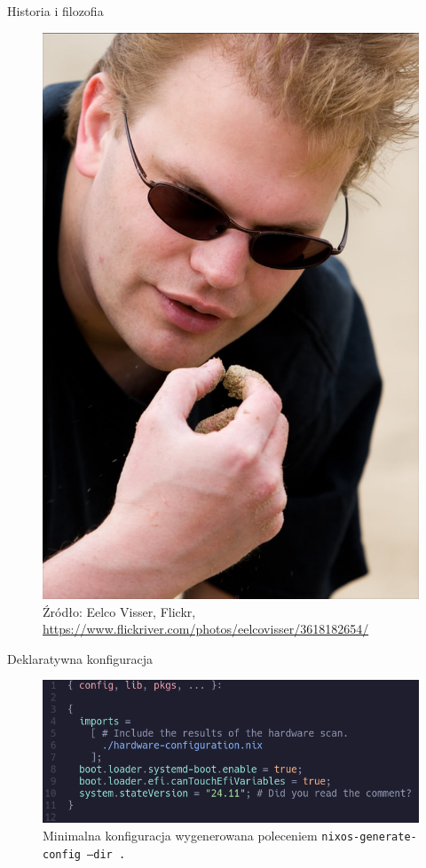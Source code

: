 \documentclass{beamer}
\begin{document}
\begin{frame}{Historia i filozofia}
    \begin{figure}
        \includegraphics[height=0.75\textheight]{./assets/eelco.jpg}
        \caption*{\scriptsize Źródło: Eelco Visser, Flickr, \url{https://www.flickriver.com/photos/eelcovisser/3618182654/}}
    \end{figure}
\end{frame}

\begin{frame}{Deklaratywna konfiguracja}
    \begin{figure}
        \includegraphics[width=\linewidth]{./assets/configuration.png}
        \caption*{\scriptsize Minimalna konfiguracja wygenerowana poleceniem \texttt{nixos-generate-config --dir .}}
    \end{figure}
\end{frame}
\end{document}
